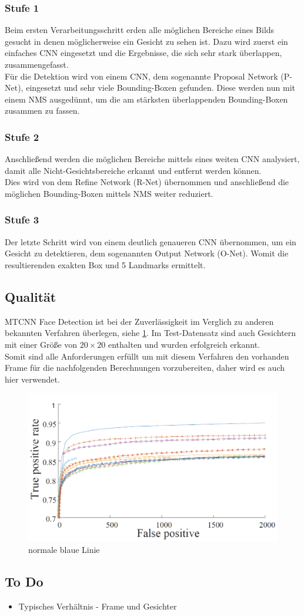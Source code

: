 \subsubsection{Stufe 1}
Beim ersten Verarbeitungsschritt erden alle möglichen Bereiche eines Bilds gesucht in denen möglicherweise ein Gesicht zu sehen ist. Dazu wird zuerst ein einfaches CNN eingesetzt und die Ergebnisse, die sich sehr stark überlappen, zusammengefasst.\\
Für die Detektion wird von einem CNN, dem sogenannte Proposal Network (P-Net), eingesetzt und sehr viele Bounding-Boxen gefunden. Diese werden nun mit einem NMS ausgedünnt, um die am stärksten überlappenden Bounding-Boxen zusammen zu fassen.
\subsubsection{Stufe 2}
Anschließend werden die möglichen Bereiche mittels eines weiten CNN analysiert, damit alle Nicht-Gesichtsbereiche erkannt und entfernt werden können.\\
Dies wird von dem Refine Network (R-Net) übernommen und anschließend die möglichen Bounding-Boxen mittels NMS weiter reduziert.
\subsubsection{Stufe 3}
Der letzte Schritt wird von einem deutlich genaueren CNN übernommen, um ein Gesicht zu detektieren, dem sogenannten Output Network (O-Net). Womit die resultierenden exakten Box und 5 Landmarks ermittelt.
\subsection{Qualität}
MTCNN Face Detection ist bei der Zuverlässigkeit im Verglich zu anderen bekannten Verfahren überlegen, siehe \ref{img_MTCNN_quality}. Im Test-Datensatz sind auch Gesichtern mit einer Größe von $20\times 20$ enthalten und wurden erfolgreich erkannt.\\
Somit sind alle Anforderungen erfüllt um mit diesem Verfahren den vorhanden Frame für die nachfolgenden Berechnungen vorzubereiten, daher wird es auch hier verwendet.
\begin{figure}
	\centering
	\includegraphics[width=0.5\linewidth]{img/MTCNN_quality}
	\caption{normale blaue Linie\cite{MTCCN}}
	\label{img_MTCNN_quality}
\end{figure}
\subsection{To Do}
\begin{itemize}
	\item Typisches Verhältnis - Frame und Gesichter
\end{itemize}

